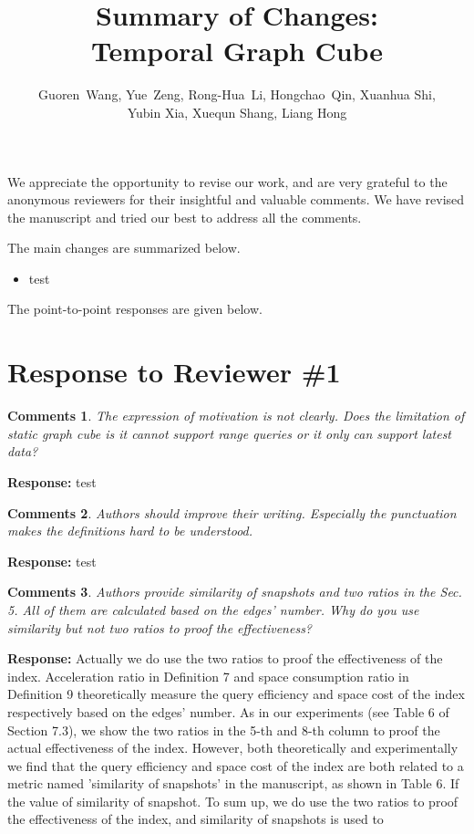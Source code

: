 \documentclass{article}
\title{Summary of Changes: \\Temporal Graph Cube}
\author{Guoren~Wang,
	Yue~Zeng,
	Rong-Hua~Li,
	Hongchao~Qin,
	Xuanhua Shi,\\
	Yubin Xia, 
	Xuequn Shang, 
	Liang Hong
}
\date{}
\newtheorem{Comments}{\textbf{Comments}}
\begin{document}
\maketitle

We appreciate the opportunity to revise our work, and are very grateful to the anonymous reviewers for their insightful and valuable comments. We have revised the manuscript and tried our best to address all the comments. 

The main changes are summarized below.
\begin{itemize}

\item test

\end{itemize}

The point-to-point responses are given below.
	
\section{Response to Reviewer \#1}
\begin{Comments}
The expression of motivation is not clearly. Does the limitation of static graph cube is it cannot support range queries or it only can support latest data?
\end{Comments}
\noindent \textbf{Response:} test

\begin{Comments}
Authors should improve their writing. Especially the punctuation makes the definitions hard to be understood.
\end{Comments}
\noindent \textbf{Response:} test

\begin{Comments}
Authors provide similarity of snapshots and two ratios in the Sec. 5. All of them are calculated based on the edges’ number. Why do you use similarity but not two ratios to proof the effectiveness?
\end{Comments}
\noindent \textbf{Response:} Actually we do use the two ratios to proof the effectiveness of the index. Acceleration ratio in Definition 7 and space consumption ratio in Definition 9 theoretically measure the query efficiency and space cost of the index respectively based on the edges' number. As in our experiments (see Table 6 of Section 7.3), we show the two ratios in the 5-th and 8-th column to proof the actual effectiveness of the index. However, both theoretically and experimentally we find that the query efficiency and space cost of the index are both related to a metric named 'similarity of snapshots' in the manuscript, as shown in Table 6. If the value of similarity of snapshot. To sum up, we do use the two ratios to proof the effectiveness of the index, and similarity of snapshots is used to 
\end{document}
